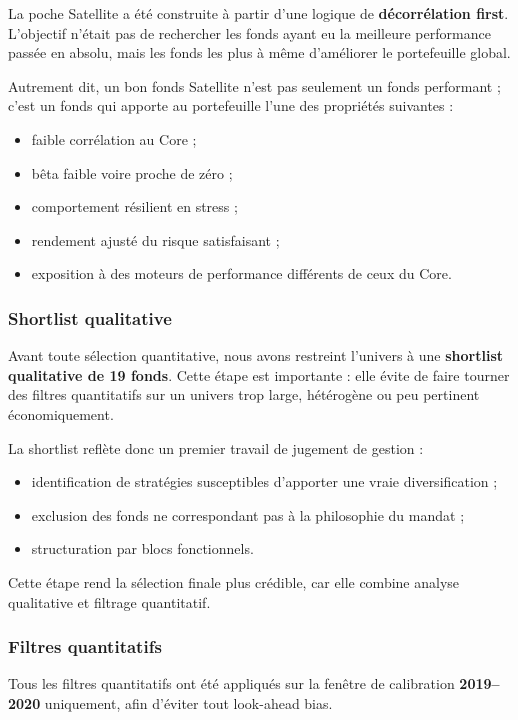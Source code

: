 \documentclass{article}
\begin{document}
La poche Satellite a été construite à partir d’une logique de \textbf{décorrélation first}. L’objectif n’était pas de rechercher les fonds ayant eu la meilleure performance passée en absolu, mais les fonds les plus à même d’améliorer le portefeuille global.

Autrement dit, un bon fonds Satellite n’est pas seulement un fonds performant ; c’est un fonds qui apporte au portefeuille l’une des propriétés suivantes :
\begin{itemize}
    \item faible corrélation au Core ;
    \item bêta faible voire proche de zéro ;
    \item comportement résilient en stress ;
    \item rendement ajusté du risque satisfaisant ;
    \item exposition à des moteurs de performance différents de ceux du Core.
\end{itemize}

\subsubsection{Shortlist qualitative}

Avant toute sélection quantitative, nous avons restreint l’univers à une \textbf{shortlist qualitative de 19 fonds}. Cette étape est importante : elle évite de faire tourner des filtres quantitatifs sur un univers trop large, hétérogène ou peu pertinent économiquement.

La shortlist reflète donc un premier travail de jugement de gestion :
\begin{itemize}
    \item identification de stratégies susceptibles d’apporter une vraie diversification ;
    \item exclusion des fonds ne correspondant pas à la philosophie du mandat ;
    \item structuration par blocs fonctionnels.
\end{itemize}

Cette étape rend la sélection finale plus crédible, car elle combine analyse qualitative et filtrage quantitatif.

\subsubsection{Filtres quantitatifs}

Tous les filtres quantitatifs ont été appliqués sur la fenêtre de calibration \textbf{2019--2020} uniquement, afin d’éviter tout look-ahead bias.
\end{document}
